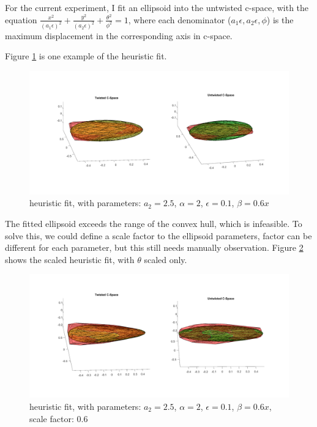 \documentclass{article}
\begin{document}
\begin{enumerate}
For the current experiment, I fit an ellipsoid into the untwisted c-space, with the equation $\frac{x^2}{(a_1 \epsilon)^2} + \frac{y^2}{(a_2 \epsilon)^2} + \frac{\theta^2}{\phi^2} = 1$, where each denominator ($a_1 \epsilon, a_2 \epsilon, \phi$) is the maximum displacement in the corresponding axis in c-space.

Figure \ref{twist_fit} is one example of the heuristic fit.
\begin{figure}
\includegraphics[scale = 0.25]{twist-untwist_c-space_fit.png}
\caption{heuristic fit, with parameters: $a_2 = 2.5$, $\alpha = 2$, $\epsilon = 0.1$, $\beta = 0.6x$}
\label{twist_fit}
\end{figure}
The fitted ellipsoid exceeds the range of the convex hull, which is infeasible. To solve this, we could define a scale factor to the ellipsoid parameters, factor can be different for each parameter, but this still needs manually observation. Figure \ref{fit_scaled} shows the scaled heuristic fit, with $\theta$ scaled only.

\begin{figure}
\includegraphics[scale = 0.25]{twist-untwist_c-space_fit_scaled.png}
\caption{heuristic fit, with parameters: $a_2 = 2.5$, $\alpha = 2$, $\epsilon = 0.1$, $\beta = 0.6x$, scale factor: 0.6}
\label{fit_scaled}
\end{figure}


\end{enumerate}
\end{document}
